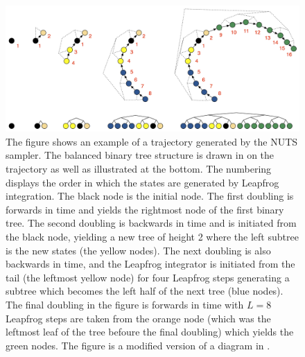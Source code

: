 \begin{figure}[h!]
    \centering
    \includegraphics[scale=0.075]{figures/drawings/doubling3_with_numbering.png}
    \caption{The figure shows an example of a trajectory generated by the NUTS sampler. The balanced binary tree structure is drawn in on the trajectory as well as illustrated at the bottom. The numbering displays the order in which the states are generated by Leapfrog integration. The black node is the initial node. The first doubling is forwards in time and yields the rightmost node of the first binary tree. The second doubling is backwards in time and is initiated from the black node, yielding a new tree of height 2 where the left subtree is the new states (the yellow nodes). The next doubling is also backwards in time, and the Leapfrog integrator is initiated from the tail (the leftmost yellow node) for four Leapfrog steps generating a subtree which becomes the left half of the next tree (blue nodes). The final doubling in the figure is forwards in time with $L = 8$ Leapfrog steps are taken from the orange node (which was the leftmost leaf of the tree befoure the final doubling) which yields the green nodes. The figure is a modified version of a diagram in \cite{nuts}.}\label{fig:nuts_trajectory}
\end{figure}

